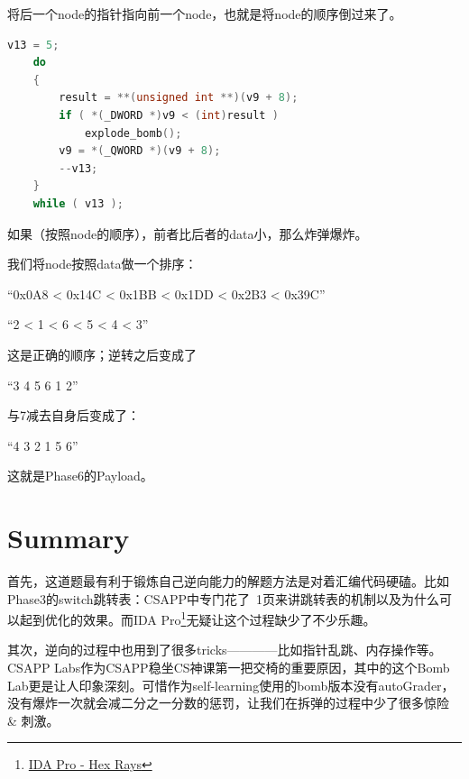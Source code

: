 \documentclass[a4pper,12pt,onecolumn]{article}
\begin{document}
将后一个node的指针指向前一个node，也就是将node的顺序倒过来了。

\begin{lstlisting}[language=c]
    v13 = 5;
    do
    {
        result = **(unsigned int **)(v9 + 8);
        if ( *(_DWORD *)v9 < (int)result )
            explode_bomb();
        v9 = *(_QWORD *)(v9 + 8);
        --v13;
    }
    while ( v13 );
\end{lstlisting}

如果（按照node的顺序），前者比后者的data小，那么炸弹爆炸。

我们将node按照data做一个排序：

``0x0A8 < 0x14C < 0x1BB < 0x1DD < 0x2B3 < 0x39C''

``2 < 1 < 6 < 5 < 4 < 3''

这是正确的顺序；逆转之后变成了

``3 4 5 6 1 2''

与7减去自身后变成了：

``4 3 2 1 5 6''

这就是Phase6的Payload。

\section{Summary}

首先，这道题最有利于锻炼自己逆向能力的解题方法是对着汇编代码硬磕。比如Phase3的switch跳转表：CSAPP中专门花了~1页来讲跳转表的机制以及为什么可以起到优化的效果。而IDA Pro\footnote{\href{https://www.hex-rays.com/ida-pro}{IDA Pro - Hex Rays}}无疑让这个过程缺少了不少乐趣。

其次，逆向的过程中也用到了很多tricks————比如指针乱跳、内存操作等。CSAPP Labs作为CSAPP稳坐CS神课第一把交椅的重要原因，其中的这个Bomb Lab更是让人印象深刻。可惜作为self-learning使用的bomb版本没有autoGrader，没有爆炸一次就会减二分之一分数的惩罚，让我们在拆弹的过程中少了很多惊险 \& 刺激。
\end{document}
